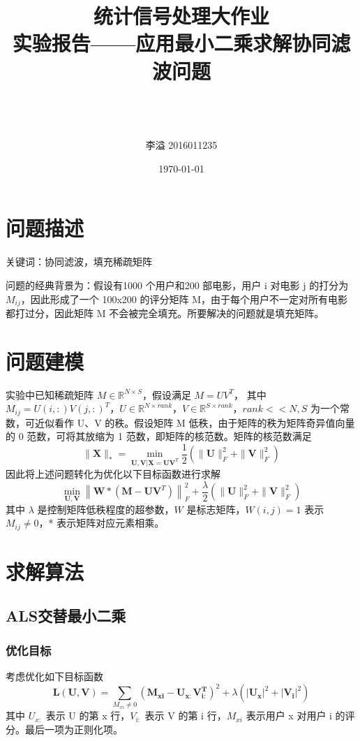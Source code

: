 \documentclass[UTF8,12pt]{ctexart}
\title{\textbf{\Huge{统计信号处理大作业} \\[2ex] \LARGE{实验报告——应用最小二乘求解协同滤波问题}}}
\author{\\ \\ \\ 李\quad 溢 2016011235}
\date{\today}
\begin{document}

\pagestyle{main}
\begin{titlepage}
\maketitle
\end{titlepage}
\tableofcontents  %
\newpage


\section{问题描述}
关键词：协同滤波，填充稀疏矩阵

问题的经典背景为：假设有1000 个用户和200 部电影，用户 i 对电影 j 的打分为 $M_{ij}$，因此形成了一个 100x200 的评分矩阵 M，由于每个用户不一定对所有电影都打过分，因此矩阵 M 不会被完全填充。所要解决的问题就是填充矩阵。


\section{问题建模}

实验中已知稀疏矩阵 $M \in \mathbb{R}^{N \times S}$，假设满足 $M=UV^T$， 其中 $M_{ij}=U(i,: )V(j, :)^T$，$U \in \mathbb{R}^{N \times rank}$，$V \in \mathbb{R}^{S \times rank}$，$rank << N, S$ 为一个常数，可近似看作 U、V 的秩。假设矩阵 M 低秩，由于矩阵的秩为矩阵奇异值向量的 0 范数，可将其放缩为 1 范数，即矩阵的核范数。矩阵的核范数满足
$$
\|\mathbf{X}\|_{*}=\min _{\mathbf{U}, \mathbf{V} | \mathbf{X}=\mathbf{U V}^{T}} \frac{1}{2}\left(\|\mathbf{U}\|_{F}^{2}+\|\mathbf{V}\|_{F}^{2}\right)
$$
因此将上述问题转化为优化以下目标函数进行求解
$$
\min _{\mathbf{U}, \mathbf{V}}\left\|\mathbf{W} *\left(\mathbf{M}-\mathbf{U V}^{T}\right)\right\|_{F}^{2}+\frac{\lambda}{2}\left(\|\mathbf{U}\|_{F}^{2}+\|\mathbf{V}\|_{F}^{2}\right)
$$
其中 $\lambda$ 是控制矩阵低秩程度的超参数，$W$ 是标志矩阵，$W(i,j) = 1$ 表示 $M_{ij} \ne 0$，* 表示矩阵对应元素相乘。


\section{求解算法}

\subsection{ALS交替最小二乘}

\subsubsection{优化目标}
考虑优化如下目标函数
$$
\mathbf{L}(\mathbf{U}, \mathbf{V})=\sum_{M_{xi} \ne 0}\left(\mathbf{M}_{\mathbf{x} \mathbf{i}}-\mathbf{U}_{\mathbf{x} :} \mathbf{V}_{\mathbf{i} :}^{\mathbf{T}}\right)^{2} + \lambda\left(\left|\mathbf{U}_{\mathbf{x}}\right|^{2}+\left|\mathbf{V}_{\mathbf{i}}\right|^{2}\right)
$$
其中 $U_{x:}$ 表示 U 的第 x 行，$V_{i:}$ 表示 V 的第 i 行，$M_{xi}$ 表示用户 x 对用户 i 的评分。最后一项为正则化项。
\end{document}
